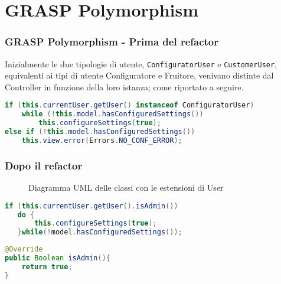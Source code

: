 \section{GRASP Polymorphism}
\begin{frame}[fragile]
    \frametitle{GRASP Polymorphism - Prima del refactor}

    Inizialmente le due tipologie di utente, \texttt{ConfiguratorUser} e \texttt{CustomerUser}, equivalenti ai tipi di utente Configuratore e Fruitore, venivano distinte dal Controller in funzione della loro istanza; come riportato a seguire.

    \lstset{style=java}
    \begin{lstlisting}[language=java, caption={v5 commit 34c1a67}]
if (this.currentUser.getUser() instanceof ConfiguratorUser)
    while (!this.model.hasConfiguredSettings())
        this.configureSettings(true);
else if (!this.model.hasConfiguredSettings())
    this.view.error(Errors.NO_CONF_ERROR);
    \end{lstlisting}

\end{frame}

\begin{frame}[fragile]
    \frametitle{Dopo il refactor}

    \begin{minipage}{.38\textwidth}
        \begin{figure}
            \centering
            \caption{Diagramma UML delle classi con le estensioni di User}
        \end{figure}
    \end{minipage}
    \hfill
    \begin{minipage}{.58\textwidth}
        \lstset{style=java}
        \begin{lstlisting}[language=java, caption={Codice refactorato in Controller}]
if (this.currentUser.getUser().isAdmin())
   do {
       this.configureSettings(true);
   }while(!model.hasConfiguredSettings());
        \end{lstlisting}

        \begin{lstlisting}[language=java, caption={Utente configuratore è admin}]
@Override
public Boolean isAdmin(){
    return true;
}
        \end{lstlisting}
    \end{minipage}

\end{frame}
